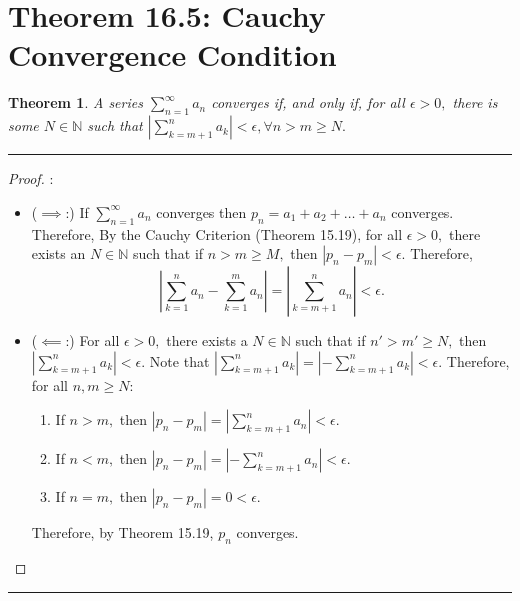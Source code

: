 \documentclass[openany, amssymb, psamsfonts]{amsart}
\newcommand{\bbN}{\mathbb{N}}
\newtheorem{thm}{Theorem}[section]
\theoremstyle{definition}
\numberwithin{equation}{section}
\begin{document}
\section*{Theorem 16.5: Cauchy Convergence Condition}
\label{16.5}
\begin{thm} A series $\displaystyle\sum_{n=1}^\infty a_n$ converges if, and only if, for all $\epsilon >0,$ there is some $N\in\bbN$ such that 
$\displaystyle \left|\sum_{k=m+1}^n a_k\right|<\epsilon,\forall n>m\geq N.$
\end{thm}
\vspace{4pt}     \hrule   \vspace{4pt} \begin{proof}:\\
\begin{itemize}
\item ($\implies$:) If $\displaystyle\sum_{n=1}^\infty a_n$ converges then $p_n = a_1 + a_2  + \dots + a_n$ converges. Therefore, By the Cauchy Criterion (Theorem 15.19), for all $\epsilon>0,$ there exists an $N \in \bbN$ such that if $n>m \geq M,$ then $|p_n - p_m|< \epsilon.$ Therefore, \[|\displaystyle\sum_{k = 1}^na_n - \displaystyle\sum_{k = 1}^ma_n| = |\displaystyle\sum_{k = m+1}^na_n|< \epsilon.\]
\item ($\impliedby$:) For all $\epsilon>0,$ there exists a $N \in \bbN$ such that if $n'>m'\geq N,$ then $\displaystyle\left|\sum_{k = m+1}^{n}a_k\right|< \epsilon.$ Note that $\displaystyle\left|\sum_{k = m+1}^{n}a_k\right| = \displaystyle\left|-\sum_{k = m+1}^{n}a_k\right|< \epsilon.$ Therefore, for all $n,m\geq N:$
\begin{enumerate}
\item If $n>m,$ then $|p_{n} - p_m| = |\displaystyle\sum_{k = m+1}^na_n|< \epsilon.$
\item If $n<m,$ then $|p_n - p_m| = |-\displaystyle\sum_{k = m+1}^na_n|< \epsilon.$
\item If $n = m,$ then $|p_n - p_m| = 0< \epsilon.$
\end{enumerate}
Therefore, by Theorem 15.19, $p_n$ converges.
\end{itemize}
\end{proof}\vspace{4pt}     \hrule   \vspace{4pt}
\end{document}
